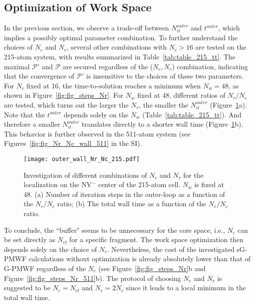 \documentclass[journal=jacsat,manuscript=article]{achemso}
\begin{document}
\subsection{Optimization of Work Space}
In the previous section, we observe a trade-off between $N^{outer}_{it}$ and $t^{outer}$, which implies a possibly optimal parameter combination. To further understand the choices of $N_c$ and $N_r$, several other combinations with $N_c > 16$ are tested on the 215-atom system, with results summarized in Table~\ref{tab:table_215_tt}. The maximal $\mathcal{P}'$ and $\mathcal{P}$ are secured regardless of the ($N_c,N_r$) combination, indicating that the convergence of $\mathcal{P}'$ is insensitive to the choices of these two parameters. For $N_c$ fixed at 16, the time-to-solution reaches a minimum when $N_w=48$, as shown in Figure~\ref{fig:fig_steps_Nr}. For $N_w$ fixed at 48, different ratios of $N_r/N_c$ are tested, which turns out the larger the $N_r$, the smaller the $N^{outer}_{it}$ (Figure~\ref{fig:fig_Nr_Nc_wall}a). Note that the $t^{outer}$ depends solely on the $N_w$ (Table~\ref{tab:table_215_tt}). And therefore a smaller $N^{outer}_{it}$ translates directly to a shorter wall time (Figure~\ref{fig:fig_Nr_Nc_wall}b). This behavior is further observed in the 511-atom system (see Figures~\ref{fig:fig_Nr_Nc_wall_511} in the SI). 

\begin{figure}
    \centering
    \texttt{[image: outer\_wall\_Nr\_Nc\_215.pdf]}
    \caption{Investigation of different combinations of $N_c$ and $N_r$ for the localization on the NV$^-$ center of the 215-atom cell. $N_w$ is fixed at 48. (a) Number of iteration steps in the outer-loop as a function of the $N_r/N_c$ ratio; (b) The total wall time as a function of the $N_r/N_c$ ratio.}
    \label{fig:fig_Nr_Nc_wall}
\end{figure}

To conclude, the ``buffer" seems to be unnecessary for the core space, i.e., $N_c$ can be set directly as $N_{rl}$ for a specific fragment. The work space optimization then depends solely on the choice of $N_r$. Nevertheless, the cost of the investigated sG-PMWF calculations without optimization is already absolutely lower than that of G-PMWF regardless of the $N_r$ (see Figure~\ref{fig:fig_steps_Nr}b and Figure~\ref{fig:fig_steps_Nr_511}b). The protocol of choosing $N_c$ and $N_r$ is suggested to be $N_c = N_{rl}$ and $N_r =2N_c$ since it leads to a local minimum in the total wall time. 
\end{document}
